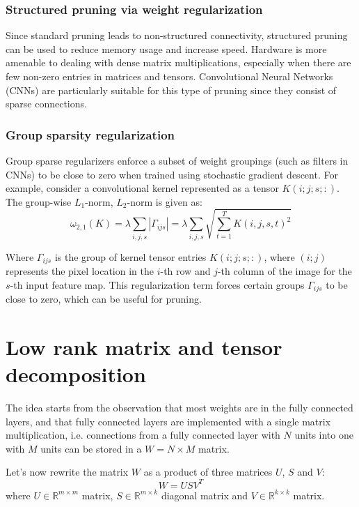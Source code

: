 \subsubsection{Structured pruning via weight regularization}
Since standard pruning leads to non-structured connectivity, structured pruning
can be used to reduce memory usage and increase speed. Hardware is more amenable
to dealing with dense matrix multiplications, especially when there are few
non-zero entries in matrices and tensors. Convolutional Neural Networks (CNNs)
are particularly suitable for this type of pruning since they consist of sparse
connections.

\subsubsection{Group sparsity regularization}
Group sparse regularizers enforce a subset of weight groupings (such as filters
in CNNs) to be close to zero when trained using stochastic gradient descent. For
example, consider a convolutional kernel represented as a tensor $K(i; j; s; :)$.
The group-wise $L_1$-norm, $L_2$-norm is given as:
\begin{equation*}
    \omega_{2, 1}(K) = \lambda \sum_{i, j, s} | \Gamma_{ijs} | = \lambda \sum_{i, j, s} \sqrt{\sum_{t= 1}^T K(i, j, s, t)^2}
\end{equation*}

Where $\Gamma_{ijs}$ is the group of kernel tensor entries $K(i; j; s; :)$, where
$(i;j)$ represents the pixel location in the $i$-th row and $j$-th column of the
image for the $s$-th input feature map. This regularization term forces certain
groups $\Gamma_{ijs}$ to be close to zero, which can be useful for pruning.

\section{Low rank matrix and tensor decomposition}
The idea starts from the observation that most weights are in the fully connected
layers, and that fully connected layers are implemented with a single matrix
multiplication, i.e. connections from a fully connected layer with $N$ units into
one with $M$ units can be stored in a $W = N \times M$ matrix.

Let's now rewrite the matrix $W$ as a product of three matrices $U$, $S$ and $V$:
\begin{equation*}
    W = USV^T
\end{equation*}
where $U \in \mathbb{R}^{m \times m}$ matrix, $S \in \mathbb{R}^{m \times k}$
diagonal matrix and $V \in \mathbb{R}^{k \times k}$ matrix.

